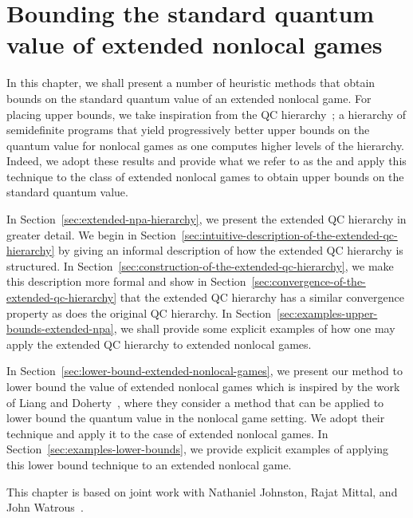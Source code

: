 \chapter{Bounding the standard quantum value of extended nonlocal games}
\label{chap:extended_npa_hierarchy}

In this chapter, we shall present a number of heuristic methods that obtain bounds on the standard quantum value of an extended nonlocal game. For placing upper bounds, we take inspiration from the QC hierarchy~\cite{Doherty2008, Navascues2007,Navascues2008}; a hierarchy of semidefinite programs that yield progressively better upper bounds on the quantum value for nonlocal games as one computes higher levels of the hierarchy. Indeed, we adopt these results and provide what we refer to as the  and apply this technique to the class of extended nonlocal games to obtain upper bounds on the standard quantum value. 

In Section~\ref{sec:extended-npa-hierarchy}, we present the extended QC hierarchy in greater detail. We begin in Section~\ref{sec:intuitive-description-of-the-extended-qc-hierarchy} by giving an informal description of how the extended QC hierarchy is structured. In Section~\ref{sec:construction-of-the-extended-qc-hierarchy}, we make this description more formal and show in Section~\ref{sec:convergence-of-the-extended-qc-hierarchy} that the extended QC hierarchy has a similar convergence property as does the original QC hierarchy. In Section~\ref{sec:examples-upper-bounds-extended-npa}, we shall provide some explicit examples of how one may apply the extended QC hierarchy to extended nonlocal games. 

In Section~\ref{sec:lower-bound-extended-nonlocal-games}, we present our method to lower bound the value of extended nonlocal games which is inspired by the work of Liang and Doherty~\cite{Liang2007}, where they consider a method that can be applied to lower bound the quantum value in the nonlocal game setting. We adopt their technique and apply it to the case of extended nonlocal games. In Section~\ref{sec:examples-lower-bounds}, we provide explicit examples of applying this lower bound technique to an extended nonlocal game. 

This chapter is based on joint work with Nathaniel Johnston, Rajat Mittal, and John Watrous~\cite{Johnston2015a}.  

